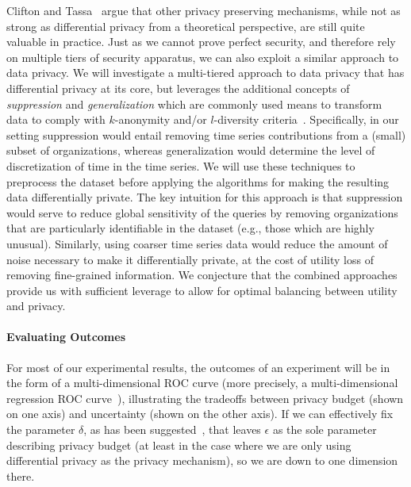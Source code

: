 Clifton and Tassa~\cite{ct13} argue that other privacy preserving
mechanisms, while not as strong as differential privacy from a
theoretical perspective, are still quite valuable in practice.
Just as we cannot prove perfect security, and therefore rely on multiple
tiers of security apparatus, we can also exploit a similar approach
to data privacy.  
We will investigate a multi-tiered approach to data
privacy that has differential privacy at its core, but leverages the
additional concepts of \emph{suppression} and \emph{generalization}
which are commonly used means to transform data to comply with
$k$-anonymity and/or $l$-diversity criteria~\cite{mkgv07}.
Specifically, in our setting suppression would entail removing time
series contributions from a (small) subset of organizations, whereas
generalization would determine the level of discretization of time in
the time series.
We will use these techniques to preprocess the dataset
before applying the algorithms for making the resulting data
differentially private.
The key intuition for this approach is that suppression would serve to
reduce global sensitivity of the queries by removing organizations that are
particularly identifiable in the dataset (e.g., those which are highly
unusual).
Similarly, using coarser time series data would reduce the amount of
noise necessary to make it differentially private, at the cost of utility loss
of removing fine-grained information.
We conjecture that the combined approaches provide us with sufficient
leverage to allow for optimal balancing between utility and privacy.


\paragraph{Evaluating Outcomes}
For most of our experimental results, the outcomes of an experiment
will be in the form of a multi-dimensional ROC curve
(more precisely, a multi-dimensional
regression ROC curve~\cite{Fawcett06,HO13,Mossman99}), illustrating
the tradeoffs between privacy budget (shown on one axis) and uncertainty
(shown on the other axis). If we can effectively fix the parameter $\delta$,
as has been suggested~\cite{dr14}, that leaves $\epsilon$ as the
sole parameter describing privacy budget (at least in the case where
we are only using differential privacy as the privacy mechanism), so we
are down to one dimension there.

